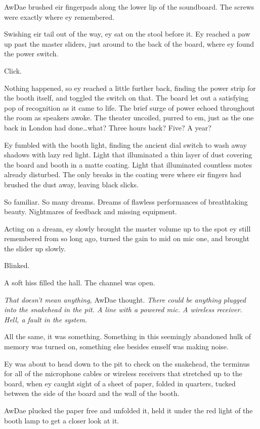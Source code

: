 AwDae brushed eir fingerpads along the lower lip of the soundboard. The screws were exactly where ey remembered.

Swishing eir tail out of the way, ey sat on the stool before it. Ey reached a paw up past the master sliders, just around to the back of the board, where ey found the power switch.

Click.

Nothing happened, so ey reached a little further back, finding the power strip for the booth itself, and toggled the switch on that. The board let out a satisfying pop of recognition as it came to life. The brief surge of power echoed throughout the room as speakers awoke. The theater uncoiled, purred to em, just as the one back in London had done\ldots{}what? Three hours back? Five? A year?

Ey fumbled with the booth light, finding the ancient dial switch to wash away shadows with lazy red light. Light that illuminated a thin layer of dust covering the board and booth in a matte coating. Light that illuminated countless motes already disturbed. The only breaks in the coating were where eir fingers had brushed the dust away, leaving black slicks.

So familiar. So many dreams. Dreams of flawless performances of breathtaking beauty. Nightmares of feedback and missing equipment.

Acting on a dream, ey slowly brought the master volume up to the spot ey still remembered from so long ago, turned the gain to mid on mic one, and brought the slider up slowly.

Blinked.

A soft hiss filled the hall. The channel was open.

\emph{That doesn't mean anything,} AwDae thought. \emph{There could be anything plugged into the snakehead in the pit. A line with a powered mic. A wireless receiver. Hell, a fault in the system.}

All the same, it was something. Something in this seemingly abandoned hulk of memory was turned on, something else besides emself was making noise.

Ey was about to head down to the pit to check on the snakehead, the terminus for all of the microphone cables or wireless receivers that stretched up to the board, when ey caught sight of a sheet of paper, folded in quarters, tucked between the side of the board and the wall of the booth.

AwDae plucked the paper free and unfolded it, held it under the red light of the booth lamp to get a closer look at it.

